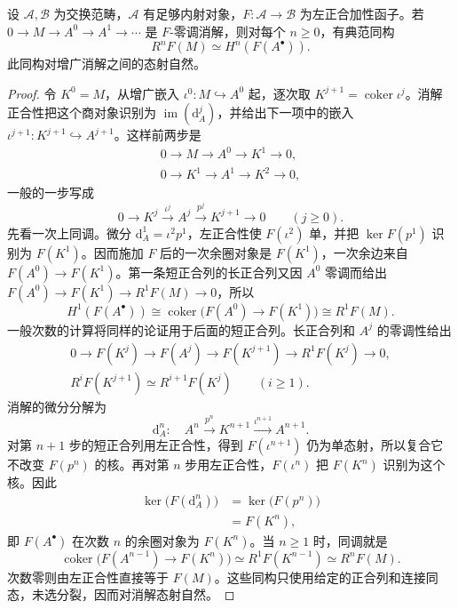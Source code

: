 \begin{theorem}\label{b4:thm:acyclic-resolution}
	设 \(\mathcal A,\mathcal B\) 为交换范畴，\(\mathcal A\) 有足够内射对象，\(F:\mathcal A\to\mathcal B\) 为左正合加性函子。若 \(0\to M\to A^0\to A^1\to\cdots\) 是 \(F\)-零调消解，则对每个 \(n\ge0\)，有典范同构
	\[
		R^nF(M)\simeq H^n(F(A^\bullet)).
	\]
	此同构对增广消解之间的态射自然。
\end{theorem}
\begin{proof}
	令 \(K^0=M\)，从增广嵌入 \(\iota^0:M\hookrightarrow A^0\) 起，逐次取 \(K^{j+1}=\operatorname{coker}\iota^j\)。消解正合性把这个商对象识别为 \(\operatorname{im}(\mathrm{d}_A^j)\)，并给出下一项中的嵌入 \(\iota^{j+1}:K^{j+1}\hookrightarrow A^{j+1}\)。这样前两步是
	\[
		\begin{gathered}
			0\longrightarrow M\longrightarrow A^0\longrightarrow K^1\longrightarrow0,\\
			0\longrightarrow K^1\longrightarrow A^1\longrightarrow K^2\longrightarrow0,
		\end{gathered}
	\]
	一般的一步写成
	\[
		0\longrightarrow K^j\xrightarrow{\iota^j} A^j\xrightarrow{p^j} K^{j+1}\longrightarrow0 \qquad(j\ge0).
	\]
	先看一次上同调。微分 \(\mathrm{d}_A^1=\iota^2p^1\)，左正合性使 \(F(\iota^2)\) 单，并把 \(\ker F(p^1)\) 识别为 \(F(K^1)\)。因而施加 \(F\) 后的一次余圈对象是 \(F(K^1)\)，一次余边来自 \(F(A^0)\to F(K^1)\)。第一条短正合列的长正合列又因 \(A^0\) 零调而给出 \(F(A^0)\to F(K^1)\to R^1F(M)\to0\)，所以
	\[
		H^1(F(A^\bullet)) \cong\operatorname{coker}\bigl(F(A^0)\to F(K^1)\bigr) \cong R^1F(M).
	\]
	一般次数的计算将同样的论证用于后面的短正合列。长正合列和 \(A^j\) 的零调性给出
	\[
		\begin{gathered}
			0\to F(K^j)\to F(A^j)\to F(K^{j+1})\to R^1F(K^j)\to0,\\
			R^iF(K^{j+1})\simeq R^{i+1}F(K^j)\qquad(i\ge1).
		\end{gathered}
	\]
	消解的微分分解为
	\[
		\mathrm{d}_A^n:\quad A^n\xrightarrow{p^n}K^{n+1} \xrightarrow{\iota^{n+1}}A^{n+1}.
	\]
	对第 \(n+1\) 步的短正合列用左正合性，得到 \(F(\iota^{n+1})\) 仍为单态射，所以复合它不改变 \(F(p^n)\) 的核。再对第 \(n\) 步用左正合性，\(F(\iota^n)\) 把 \(F(K^n)\) 识别为这个核。因此
	\[
		\begin{aligned}
			\ker\bigl(F(\mathrm{d}_A^n)\bigr) &=\ker\bigl(F(p^n)\bigr)\\
			&=F(K^n),
		\end{aligned}
	\]
	即 \(F(A^\bullet)\) 在次数 \(n\) 的余圈对象为 \(F(K^n)\)。当 \(n\ge1\) 时，同调就是
	\[
		\operatorname{coker}\bigl(F(A^{n-1})\to F(K^n)\bigr) \simeq R^1F(K^{n-1})\simeq R^nF(M).
	\]
	次数零则由左正合性直接等于 \(F(M)\)。这些同构只使用给定的正合列和连接同态，未选分裂，因而对消解态射自然。


\end{proof}

